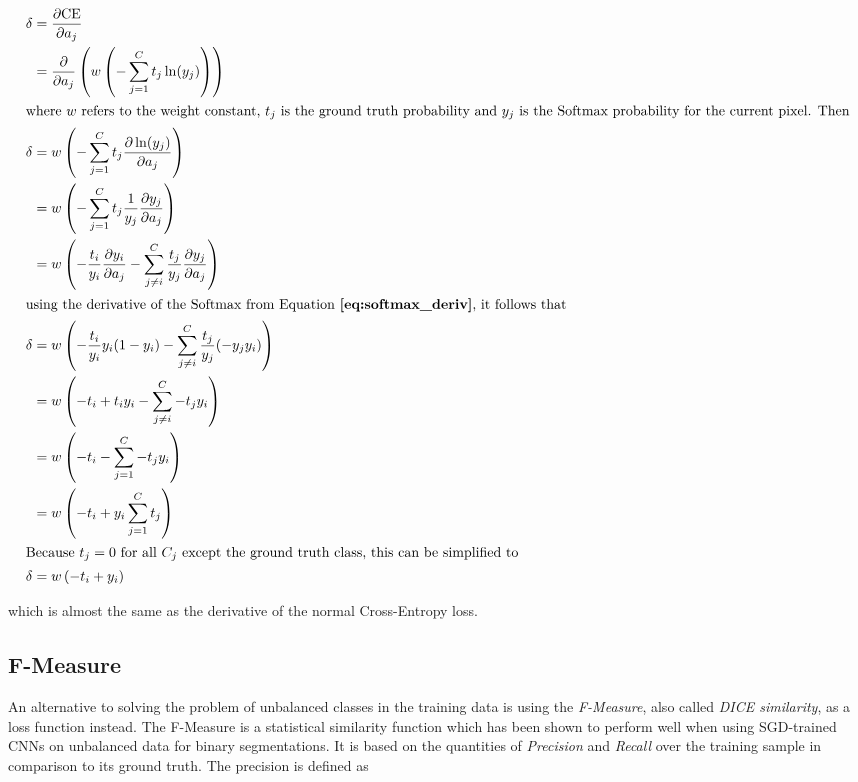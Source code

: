 \begin {align}
	\delta &= \frac{\partial \text{CE}}{\partial a_j} \\
		&= \frac{\partial}{\partial a_j} \left ( w \left ( - \sum \limits_{j=1}^{C} t_j \ln(y_j) \right ) \right ) \\ \intertext{where $w$ refers to the weight constant, $t_j$ is the ground truth probability and $y_j$ is the Softmax probability for the current pixel. Then}
		\delta &= w \left ( - \sum \limits_{j=1}^{C} t_j \frac{\partial \ln(y_j)}{\partial a_j} \right ) \\
		&= w \left (- \sum \limits_{j=1}^{C} t_j \frac{1}{y_j} \frac{\partial y_j}{\partial a_j} \right ) \\
		&= w \left ( - \frac{t_i}{y_i} \frac{\partial y_i}{\partial a_j} - \sum \limits_{j \neq i}^{C} \frac{t_j}{y_j} \frac{\partial y_j}{\partial a_j} \right ) \\ \intertext{using the derivative of the Softmax from Equation \textbf{\ref{eq:softmax_deriv}}, it follows that}
		\delta &= w \left ( - \frac{t_i}{y_i} y_i (1 - y_i) - \sum \limits_{j \neq i}^{C} \frac{t_j}{y_j} (- y_j y_i) \right ) \\
		&= w \left ( - t_i + t_i y_i - \sum \limits_{j \neq i}^{C} - t_j y_i \right ) \\
		&= w \left ( - t_i - \sum \limits_{j=1}^{C} - t_j y_i  \right ) \\
		&= w \left ( - t_i + y_i \sum \limits_{j=1}^{C} t_j \right ) \\ \intertext{Because $t_j = 0$ for all $C_j$ except the ground truth class, this can be simplified to} 
		\delta &= w \left (- t_i + y_i \right )
\end {align}

\noindent which is almost the same as the derivative of the normal Cross-Entropy loss.


		\subsection{F-Measure}
\label{subsec:fmeasure}

An alternative to solving the problem of unbalanced classes in the training data is using the \textit{F-Measure}, also called \textit{DICE similarity}, as a loss function instead. The F-Measure is a statistical similarity function which has been shown to perform well when using SGD-trained CNNs on unbalanced data for binary segmentations. \cite{fmeasure3, fmeasure4, fmeasure5} It is based on the quantities of \textit{Precision} and \textit{Recall} over the training sample in comparison to its ground truth. The precision is defined as

